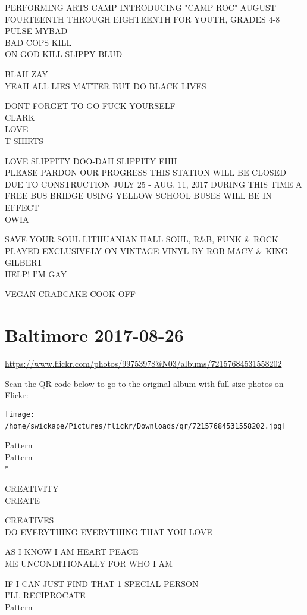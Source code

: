 \documentclass[10pt,letterpaper]{article}
\begin{document}
PERFORMING ARTS CAMP INTRODUCING "CAMP ROC" AUGUST FOURTEENTH THROUGH EIGHTEENTH FOR YOUTH, GRADES 4{-}8\\
PULSE MYBAD\\
BAD COPS KILL\\
ON GOD KILL SLIPPY BLUD

BLAH ZAY\\
YEAH ALL LIES MATTER BUT DO BLACK LIVES

DONT FORGET TO GO FUCK YOURSELF\\
CLARK\\
LOVE\\
T{-}SHIRTS

LOVE SLIPPITY DOO{-}DAH SLIPPITY EHH\\
PLEASE PARDON OUR PROGRESS THIS STATION WILL BE CLOSED DUE TO CONSTRUCTION JULY 25 {-} AUG. 11, 2017 DURING THIS TIME A FREE BUS BRIDGE USING YELLOW SCHOOL BUSES WILL BE IN EFFECT\\
OWIA

SAVE YOUR SOUL LITHUANIAN HALL SOUL, R\&B, FUNK \& ROCK PLAYED EXCLUSIVELY ON VINTAGE VINYL BY ROB MACY \& KING GILBERT\\
HELP!  I'M GAY

VEGAN CRABCAKE COOK{-}OFF
\

\section*{Baltimore 2017-08-26}

\url{https://www.flickr.com/photos/99753978@N03/albums/72157684531558202}

Scan the QR code below to go to the original album with full-size photos on Flickr:

\texttt{[image: /home/swickape/Pictures/flickr/Downloads/qr/72157684531558202.jpg]}
\

Pattern\\
Pattern\\
*

CREATIVITY\\
CREATE

CREATIVES\\
DO EVERYTHING EVERYTHING THAT YOU LOVE

AS I KNOW I AM HEART PEACE\\
ME UNCONDITIONALLY FOR WHO I AM

IF I CAN JUST FIND THAT 1 SPECIAL PERSON\\
I'LL RECIPROCATE\\
Pattern
\end{document}
